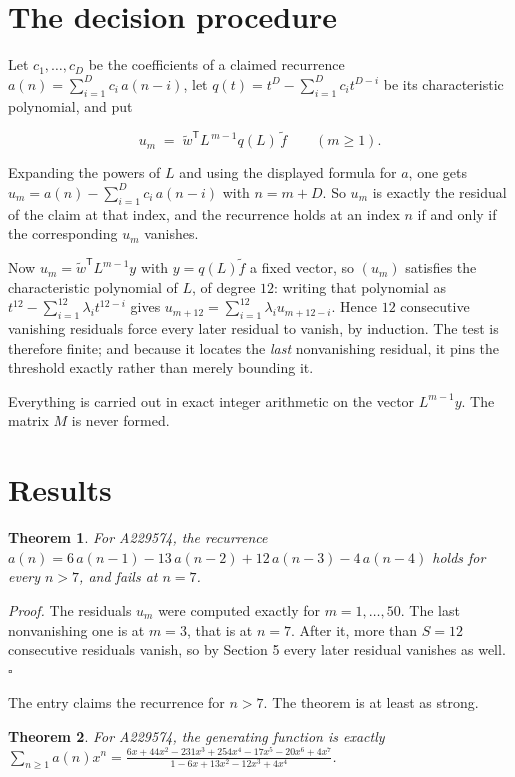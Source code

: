 \documentclass[11pt]{article}
\newtheorem{theorem}{Theorem}
\theoremstyle{definition}
\begin{document}
\section{The decision procedure}

Let $c_1,\dots,c_D$ be the coefficients of a claimed recurrence $a(n) = \sum_{i=1}^{D} c_i\,a(n-i)$, let $q(t) = t^{D} - \sum_{i=1}^{D} c_i t^{D-i}$ be its characteristic polynomial, and put

\[u_m \;=\; \tilde w^{\mathsf T} L^{\,m-1} q(L)\,\tilde f \qquad (m \ge 1).\]

Expanding the powers of $L$ and using the displayed formula for $a$, one gets $u_m = a(n) - \sum_{i=1}^{D} c_i\,a(n-i)$ with $n = m + D$. So $u_m$ is exactly the residual of the claim at that index, and the recurrence holds at an index $n$ if and only if the corresponding $u_m$ vanishes.

Now $u_m = \tilde w^{\mathsf T} L^{m-1} y$ with $y = q(L)\tilde f$ a fixed vector, so $(u_m)$ satisfies the characteristic polynomial of $L$, of degree $12$: writing that polynomial as $t^{12} - \sum_{i=1}^{12} \lambda_i t^{12-i}$ gives $u_{m+12} = \sum_{i=1}^{12} \lambda_i u_{m+12-i}$. Hence $12$ consecutive vanishing residuals force every later residual to vanish, by induction. The test is therefore finite; and because it locates the {\itshape last} nonvanishing residual, it pins the threshold exactly rather than merely bounding it.

Everything is carried out in exact integer arithmetic on the vector $L^{m-1}y$. The matrix $M$ is never formed.

\section{Results}

\begin{theorem} For A229574, the recurrence $a(n) = 6\,a(n-1) - 13\,a(n-2) + 12\,a(n-3) - 4\,a(n-4)$ holds for every $n > 7$, and fails at $n = 7$.\end{theorem}

{\itshape Proof.} The residuals $u_m$ were computed exactly for $m = 1,\dots,50$. The last nonvanishing one is at $m = 3$, that is at $n = 7$. After it, more than $S = 12$ consecutive residuals vanish, so by Section 5 every later residual vanishes as well. $\square$

The entry claims the recurrence for $n > 7$. The theorem is at least as strong.

\begin{theorem} For A229574, the generating function is exactly $\sum_{n\ge 1} a(n)x^n = \frac{6x + 44x^{2} - 231x^{3} + 254x^{4} - 17x^{5} - 20x^{6} + 4x^{7}}{1 - 6x + 13x^{2} - 12x^{3} + 4x^{4}}$.\end{theorem}
\end{document}
